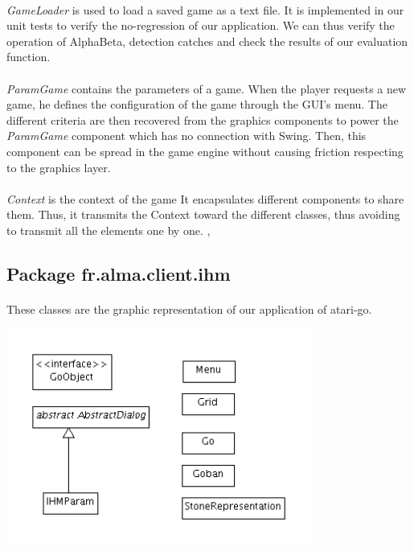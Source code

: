 \documentclass[a4paper,12pt]{report}
\begin{document}
	    \paragraph*{}
		\textit{GameLoader} is used to load a saved game as a text file. It is implemented in our unit tests to verify the no-regression of our application.
		We can thus verify the operation of AlphaBeta, detection catches and check the results of our evaluation function.

	    \paragraph*{}
		\textit{ParamGame} contains the parameters of a game. When the player requests a new game, he defines the configuration of the game through the GUI's menu.
		The different criteria are then recovered from the graphics components to power the \textit{ParamGame} component which has no connection with Swing.
		Then, this component can be spread in the game engine without causing friction respecting to the graphics layer.
	   
	    \paragraph*{}
		\textit{Context} is the context of the game It encapsulates different components to share them. Thus, it transmits the Context toward the different classes, thus avoiding to transmit all the elements one by one.
,
	\subsection{Package fr.alma.client.ihm}
	  \paragraph*{}
	      These classes are the graphic representation of our application of atari-go.
	      \begin{center}
		    \includegraphics[width=0.75\textwidth]{img_rapport/designing_8.png}
		\end{center}
\end{document}

